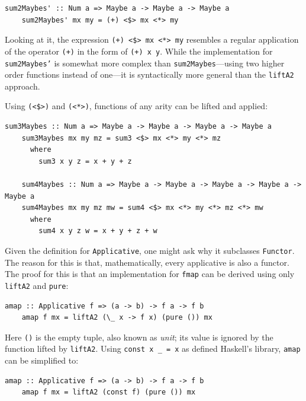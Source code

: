 \documentclass[UdineBachThesis,american,11pt]{PhdThesis}
\begin{document}
  \begin{Verbatim}[gobble=4,fontsize=\small]
    sum2Maybes' :: Num a => Maybe a -> Maybe a -> Maybe a
    sum2Maybes' mx my = (+) <$> mx <*> my
  \end{Verbatim}

  Looking at it, the expression \mbox{\texttt{(+) <\$> mx <*> my}} resembles a
  regular application of the operator \mbox{\texttt{(+)}} in the form of
  \mbox{\texttt{(+) x y}}. While the implementation for
  \mbox{\texttt{sum2Maybes'}} is somewhat more complex than
  \mbox{\texttt{sum2Maybes}}---using two higher order functions instead of
  one---it is syntactically more general than the \mbox{\texttt{liftA2}}
  approach.

  Using \mbox{\texttt{(<\$>)}} and \mbox{\texttt{(<*>)}}, functions of any arity
  can be lifted and applied:

  \begin{Verbatim}[gobble=4,fontsize=\small]
    sum3Maybes :: Num a => Maybe a -> Maybe a -> Maybe a -> Maybe a
    sum3Maybes mx my mz = sum3 <$> mx <*> my <*> mz
      where
        sum3 x y z = x + y + z

    sum4Maybes :: Num a => Maybe a -> Maybe a -> Maybe a -> Maybe a -> Maybe a
    sum4Maybes mx my mz mw = sum4 <$> mx <*> my <*> mz <*> mw
      where
        sum4 x y z w = x + y + z + w
  \end{Verbatim}

  Given the definition for \mbox{\texttt{Applicative}}, one might ask why it
  subclasses \mbox{\texttt{Functor}}. The reason for this is that,
  mathematically, every applicative is also a functor. The proof for this is
  that an implementation for \mbox{\texttt{fmap}} can be derived using only
  \mbox{\texttt{liftA2}} and \mbox{\texttt{pure}}:

  \begin{Verbatim}[gobble=4,fontsize=\small]
    amap :: Applicative f => (a -> b) -> f a -> f b
    amap f mx = liftA2 (\_ x -> f x) (pure ()) mx
  \end{Verbatim}

  Here \mbox{\texttt{()}} is the empty tuple, also known as \emph{unit}; its
  value is ignored by the function lifted by \mbox{\texttt{liftA2}}. Using
  \mbox{\texttt{const x \_ = x}} as defined Haskell's library,
  \mbox{\texttt{amap}} can be simplified to:

  \begin{Verbatim}[gobble=4,fontsize=\small]
    amap :: Applicative f => (a -> b) -> f a -> f b
    amap f mx = liftA2 (const f) (pure ()) mx
  \end{Verbatim}
\end{document}
